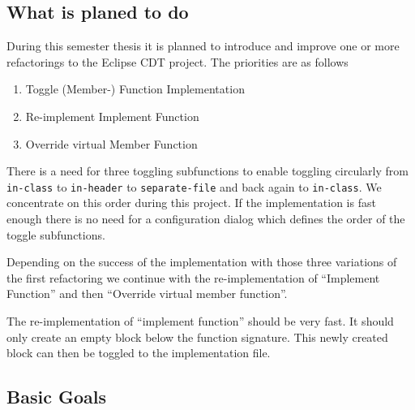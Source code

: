 \documentclass[a4paper,12pt]{scrreprt}
\begin{document}
\subsection*{What is planed to do}

During this semester thesis it is planned to introduce and improve one or more
refactorings to the Eclipse CDT project. The priorities are as follows

\begin{enumerate}
\item Toggle (Member-) Function Implementation
\item Re-implement Implement Function
\item Override virtual Member Function
\end{enumerate}

There is a need for three toggling subfunctions to enable toggling circularly from \texttt{in-class}
to \texttt{in-header} to \texttt{separate-file}  and back again to
\texttt{in-class}. We concentrate on this order during this project. If the
implementation is fast enough there is no need for a configuration dialog which
defines the order of the toggle subfunctions.\newline

Depending on the success of the implementation with those three variations of the
first refactoring we continue with the re-implementation of  ``Implement
Function'' and then ``Override virtual member function''.\newline

The re-implementation of ``implement function'' should be very fast. It should
only create an empty block below the function signature. This newly created
block can then be toggled to the implementation file.

\subsection*{Basic Goals}
\end{document}
